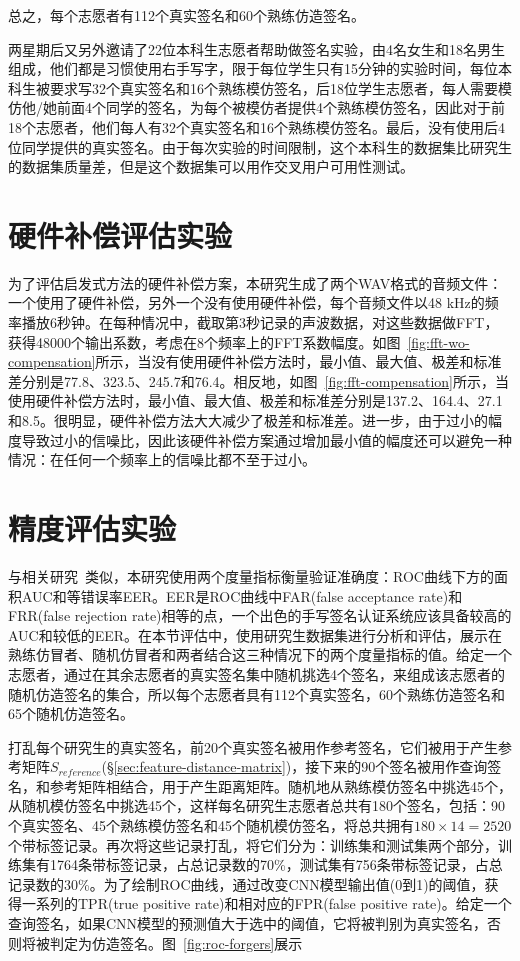 总之，每个志愿者有112个真实签名和60个熟练仿造签名。

两星期后又另外邀请了22位本科生志愿者帮助做签名实验，由4名女生和18名男生组成，他们都是习惯使用右手写字，限于每位学生只有15分钟的实验时间，每位本科生被要求写32个真实签名和16个熟练模仿签名，后18位学生志愿者，每人需要模仿他/她前面4个同学的签名，为每个被模仿者提供4个熟练模仿签名，因此对于前18个志愿者，他们每人有32个真实签名和16个熟练模仿签名。最后，没有使用后4位同学提供的真实签名。由于每次实验的时间限制，这个本科生的数据集比研究生的数据集质量差，但是这个数据集可以用作交叉用户可用性测试。

\section{硬件补偿评估实验}
为了评估启发式方法的硬件补偿方案，本研究生成了两个WAV格式的音频文件：一个使用了硬件补偿，另外一个没有使用硬件补偿，每个音频文件以48 kHz的频率播放6秒钟。在每种情况中，截取第3秒记录的声波数据，对这些数据做FFT，获得48000个输出系数，考虑在8个频率上的FFT系数幅度。如图~\ref{fig:fft-wo-compensation}所示，当没有使用硬件补偿方法时，最小值、最大值、极差和标准差分别是77.8、323.5、245.7和76.4。相反地，如图~\ref{fig:fft-compensation}所示，当使用硬件补偿方法时，最小值、最大值、极差和标准差分别是137.2、164.4、27.1和8.5。很明显，硬件补偿方法大大减少了极差和标准差。进一步，由于过小的幅度导致过小的信噪比，因此该硬件补偿方案通过增加最小值的幅度还可以避免一种情况：在任何一个频率上的信噪比都不至于过小。


\section{精度评估实验}
\label{sec:accuracy-experiment}

与相关研究~\cite{fischer2015robust,levy2018handwritten}类似，本研究使用两个度量指标衡量验证准确度：ROC曲线下方的面积AUC和等错误率EER。EER是ROC曲线中FAR(false acceptance rate)和FRR(false rejection rate)相等的点，一个出色的手写签名认证系统应该具备较高的AUC和较低的EER。在本节评估中，使用研究生数据集进行分析和评估，展示在熟练仿冒者、随机仿冒者和两者结合这三种情况下的两个度量指标的值。给定一个志愿者，通过在其余志愿者的真实签名集中随机挑选4个签名，来组成该志愿者的随机仿造签名的集合，所以每个志愿者具有112个真实签名，60个熟练仿造签名和65个随机仿造签名。

打乱每个研究生的真实签名，前20个真实签名被用作参考签名，它们被用于产生参考矩阵$S_{reference}$(\S\ref{sec:feature-distance-matrix})，接下来的90个签名被用作查询签名，和参考矩阵相结合，用于产生距离矩阵。随机地从熟练模仿签名中挑选45个，从随机模仿签名中挑选45个，这样每名研究生志愿者总共有180个签名，包括：90个真实签名、45个熟练模仿签名和45个随机模仿签名，将总共拥有$180\times 14=2520$个带标签记录。再次将这些记录打乱，将它们分为：训练集和测试集两个部分，训练集有1764条带标签记录，占总记录数的70\%，测试集有756条带标签记录，占总记录数的30\%。为了绘制ROC曲线，通过改变CNN模型输出值(0到1)的阈值，获得一系列的TPR(true positive rate)和相对应的FPR(false positive rate)。给定一个查询签名，如果CNN模型的预测值大于选中的阈值，它将被判别为真实签名，否则将被判定为仿造签名。图~\ref{fig:roc-forgers}展示

